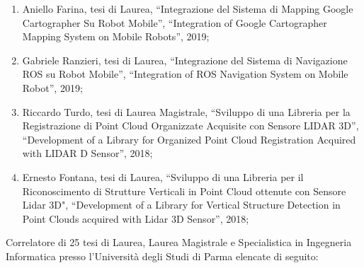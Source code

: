 \documentclass[11pt]{article}
\begin{document}
\begin{enumerate}
\item Aniello Farina, tesi di Laurea, ``Integrazione del Sistema di Mapping Google Cartographer Su Robot Mobile'', 
  ``Integration of Google Cartographer Mapping System on Mobile Robots'', 2019;
\item Gabriele Ranzieri, tesi di Laurea, ``Integrazione del Sistema di Navigazione ROS su Robot Mobile'', ``Integration of ROS Navigation System on Mobile Robot'', 2019;
\item Riccardo Turdo, tesi di Laurea Magistrale, ``Sviluppo di una Libreria per la Registrazione di Point Cloud Organizzate Acquisite con Sensore LIDAR 3D'',
  ``Development of a Library for Organized Point Cloud Registration Acquired with LIDAR D Sensor'', 2018;
\item Ernesto Fontana, tesi di Laurea, ``Sviluppo di una Libreria per il Riconoscimento di Strutture Verticali in Point Cloud ottenute con Sensore Lidar 3D", 
   ``Development of a Library for Vertical Structure Detection in Point Clouds acquired with Lidar 3D Sensor'', 2018;
\end{enumerate}
%
\vspace{3mm}
%
Correlatore di 25 tesi di Laurea, Laurea Magistrale e Specialistica in Ingegneria Informatica presso l'Universit\`a degli Studi di Parma elencate di seguito: 
\end{document}

